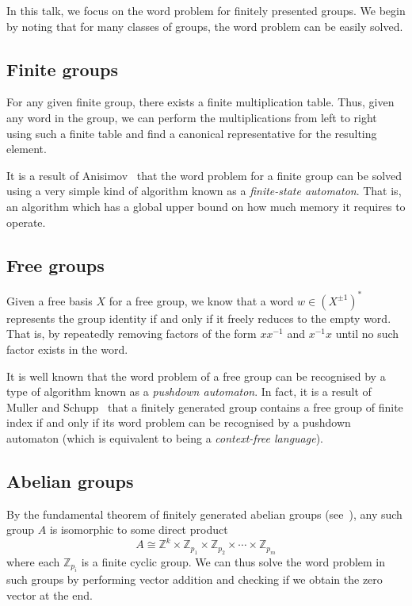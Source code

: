 \documentclass[11pt,a4paper,reqno]{amsart}
\theoremstyle{plain}
\theoremstyle{definition}
\theoremstyle{definition}
\begin{document}
In this talk, we focus on the word problem for finitely presented groups.
We begin by noting that for many classes of groups, the word problem can be easily solved.

\subsection{Finite groups}

For any given finite group, there exists a finite multiplication table.
Thus, given any word in the group, we can perform the multiplications from left to right using such a finite table and find a canonical representative for the resulting element.

It is a result of Anisimov~\cite{anisimov1971} that the word problem for a finite group can be solved using a very simple kind of algorithm known as a \textit{finite-state automaton}.
That is, an algorithm which has a global upper bound on how much memory it requires to operate.

\subsection{Free groups}

Given a free basis $X$ for a free group, we know that a word $w\in (X^{\pm 1})^*$ represents the group identity if and only if it freely reduces to the empty word.
That is, by repeatedly removing factors of the form $x x^{-1}$ and $x^{-1}x$ until no such factor exists in the word.

It is well known that the word problem of a free group can be recognised by a type of algorithm known as a \textit{pushdown automaton}.
In fact, it is a result of Muller and Schupp~\cite{muller1983} that a finitely generated group contains a free group of finite index if and only if its word problem can be recognised by a pushdown automaton (which is equivalent to being a \textit{context-free language}).

\subsection{Abelian groups}

By the fundamental theorem of finitely generated abelian groups (see~\cite{poincare1900}), any such group $A$ is isomorphic to some direct product
\[
	A \cong \mathbb Z^k \times \mathbb Z_{p_1}\times \mathbb Z_{p_2}\times\cdots\times \mathbb Z_{p_m}
\]
where each $\mathbb Z_{p_i}$ is a finite cyclic group.
We can thus solve the word problem in such groups by performing vector addition and checking if we obtain the zero vector at the end.
\end{document}
